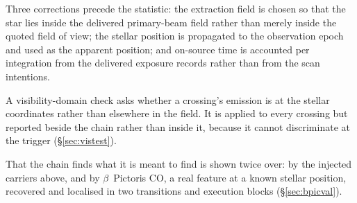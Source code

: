 Three corrections precede the statistic: the extraction field is chosen so
that the star lies inside the delivered primary-beam field rather than merely
inside the quoted field of view; the stellar position is propagated to the
observation epoch and used as the apparent position; and on-source time is
accounted per integration from the delivered exposure records rather than
from the scan intentions.

A visibility-domain check asks whether a crossing's emission is at the
stellar coordinates rather than elsewhere in the field. It is applied to
every crossing but reported beside the chain rather than inside it, because
it cannot discriminate at the trigger (\S\ref{sec:vistest}).

That the chain finds what it is meant to find is shown twice over: by the
injected carriers above, and by $\beta$~Pictoris CO, a real feature at a
known stellar position, recovered and localised in two transitions and
\NStageOneBpicEb{} execution blocks (\S\ref{sec:bpicval}).

